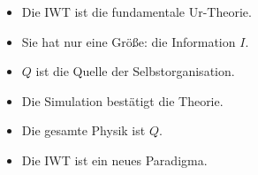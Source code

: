 \begin{itemize}
\item Die IWT ist die fundamentale Ur-Theorie.
\item Sie hat nur eine Größe: die Information \( I \).
\item \( Q \) ist die Quelle der Selbstorganisation.
\item Die Simulation bestätigt die Theorie.
\item Die gesamte Physik ist \( Q \).
\item Die IWT ist ein neues Paradigma.
\end{itemize}